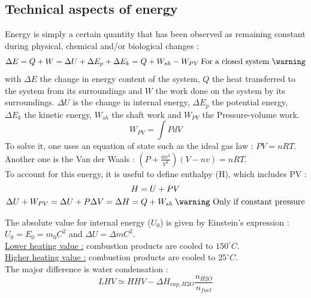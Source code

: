 \documentclass[../main.tex]{subfiles}
\begin{document}
\localtableofcontents

\subsection{Technical aspects of energy}
Energy is simply a certain quantity that has been observed as remaining constant during physical, chemical and/or biological changes : \begin{equation}
    \Delta E = Q + W = \Delta U + \Delta E_p + \Delta E_k = Q + W_{sh} - W_{PV} \: \text{For a closed system \warning}
\end{equation}
with $\Delta E$ the change in energy content of the system, $Q$ the heat transferred to the system from its surroundings and $W$ the work done on the system by its surroundings. $\Delta U$ is the change in internal energy, $\Delta E_p$ the potential energy, $\Delta E_k$ the kinetic energy, $W_{sh}$ the shaft work and $W_{PV}$ the Pressure-volume work.\\

\begin{equation}
    W_{PV} = \int PdV
\end{equation}
To solve it, one uses an equation of state such as the ideal gas law : $PV = nRT$. Another one is the Van der Waals : $(P + \frac{an^2}{V^2})(V-nv) = nRT$.\\
To account for this energy, it is useful to define enthalpy (H), which includes PV : \begin{equation}\begin{gathered}
    H = U+PV\\
    \Delta U + W_{PV} = \Delta U + P\Delta V = \Delta H = Q+W_{sh} \: \text{\warning Only if constant pressure}
    \end{gathered}
\end{equation}

The absolute value for internal energy ($U_0$) is given by Einstein's expression : $U_0 = E_0 = m_0C^2$ and $\Delta U = \Delta m C^2$.\\

\quad \underline{Lower heating value :} combustion products are cooled to $150^\circ C$.\\

\quad \underline{Higher heating value :} combustion products are cooled to $25^\circ C$.\\

The major difference is water condensation : \begin{equation}
    LHV \simeq HHV - \Delta H_{vap, H2O} \frac{n_{H2O}}{n_{fuel}}
\end{equation}
\end{document}
